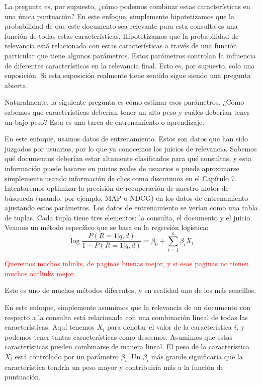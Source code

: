 La pregunta es, por supuesto, ¿cómo podemos combinar estas características en una única puntuación? En este enfoque, simplemente hipotetizamos que la probabilidad de que este documento sea relevante para esta consulta es una función de todas estas características. Hipotetizamos que la probabilidad de relevancia está relacionada con estas características a través de una función particular que tiene algunos parámetros. Estos parámetros controlan la influencia de diferentes características en la relevancia final. Esto es, por supuesto, solo una suposición. Si esta suposición realmente tiene sentido sigue siendo una pregunta abierta.

Naturalmente, la siguiente pregunta es cómo estimar esos parámetros. ¿Cómo sabemos qué características deberían tener un alto peso y cuáles deberían tener un bajo peso? Esta es una tarea de entrenamiento o aprendizaje.

En este enfoque, usamos datos de entrenamiento. Estos son datos que han sido juzgados por usuarios, por lo que ya conocemos los juicios de relevancia. Sabemos qué documentos deberían estar altamente clasificados para qué consultas, y esta información puede basarse en juicios reales de usuarios o puede aproximarse simplemente usando información de clics como discutimos en el Capítulo 7. Intentaremos optimizar la precisión de recuperación de nuestro motor de búsqueda (usando, por ejemplo, MAP o NDCG) en los datos de entrenamiento ajustando estos parámetros. Los datos de entrenamiento se verían como una tabla de tuplas. Cada tupla tiene tres elementos: la consulta, el documento y el juicio. Veamos un método específico que se basa en la regresión logística:
\begin{equation}
    \log \frac{P(R = 1 | q, d)}{1 - P(R = 1 | q, d)} = \beta_0 + \sum_{i = 1}^n \beta_i X_i
\end{equation}

\textcolor{red}{Queremos muchos inlinks, de paginas buenas mejor, y si esas paginas no tienen muchos outlinks mejor.}

Este es uno de muchos métodos diferentes, y en realidad uno de los más sencillos.

En este enfoque, simplemente asumimos que la relevancia de un documento con respecto a la consulta está relacionada con una combinación lineal de todas las características. Aquí tenemos $X_i$ para denotar el valor de la característica $i$, y podemos tener tantas características como deseemos. Asumimos que estas características pueden combinarse de manera lineal. El peso de la característica $X_i$ está controlado por un parámetro $\beta_i$. Un $\beta_i$ más grande significaría que la característica tendría un peso mayor y contribuiría más a la función de puntuación.

